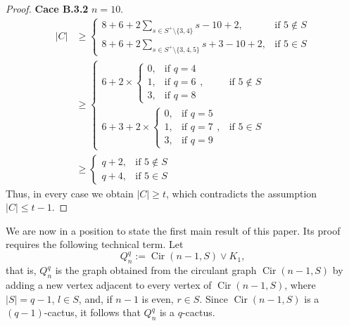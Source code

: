 \documentclass{article}
\begin{document}
\begin{proof}
{\bf Cace B.3.2}  $n=10$.
\begin{align*}
|C| &\geq 
\begin{cases}
\displaystyle 8 + 6+2\sum_{s\in S^+\setminus\{3,4\}} s-10+2, & \text{if } 5\notin S \\[4pt]
\displaystyle 8 +6+ 2\sum_{s\in S^+\setminus\{3,4,5\}} s+ 3-10+2, & \text{if } 5\in S
\end{cases} \\
&\geq 
\begin{cases}
\displaystyle 6 + 2\times
\begin{cases}
0, & \text{if } q=4 \\
1, & \text{if } q=6 \\
3, & \text{if } q=8 
\end{cases}, & \text{if } 5\notin S \\[4pt]
\displaystyle 6+ 3 + 2\times
\begin{cases}
0, & \text{if } q=5 \\
1, & \text{if } q=7 \\
3, & \text{if } q=9 
\end{cases}, & \text{if } 5\in S
\end{cases} \\
&\geq 
\begin{cases}
\displaystyle q+2, & \text{if } 5\notin S \\[4pt]
\displaystyle q+4, & \text{if } 5\in S
\end{cases}
\end{align*}
Thus, in every case we obtain \(|C| \ge t\), which contradicts the assumption \(|C| \le t-1\).
\end{proof}

We are now in a position to state the first main result of this paper. Its proof requires the following technical term. Let  
\[
Q_n^{q}:=\operatorname{Cir}(n-1,S)\vee K_1,
\]
that is, \(Q_n^{q}\) is the graph obtained from the circulant graph \(\operatorname{Cir}(n-1,S)\) by adding a new vertex adjacent to every vertex of \(\operatorname{Cir}(n-1,S)\), where \(|S|=q-1\), \(l\in S\), and, if \(n-1\) is even, \(r\in S\). Since $\operatorname{Cir}(n-1,S)$ is a $(q-1)$-cactus, it follows that \(Q_n^{q}\) is a $q$-cactus.
\end{document}

